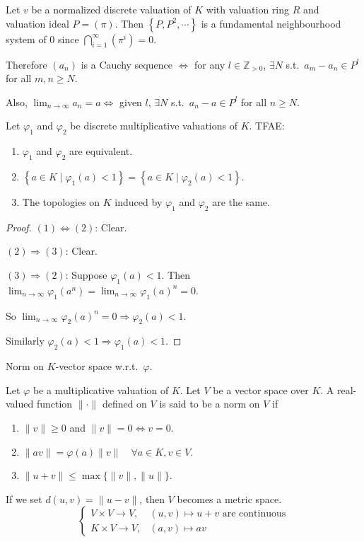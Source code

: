 \documentclass[11pt, a4paper]{report}
\begin{document}
\begin{proposition}
Let $v$ be a normalized discrete valuation of $K$ with valuation ring $R$ and valuation ideal $P=(\pi)$. Then $\left\{P, P^{2}, \cdots\right\}$ is a fundamental neighbourhood system of $0$ since $\bigcap_{i=1}^{\infty}\left(\pi^{i}\right)=0$.

Therefore $\left(a_{n}\right)$ is a Cauchy sequence $\Leftrightarrow$ for any $l \in \mathbb{Z}_{>0}$, $\exists N$ s.t.\ $a_{m}-a_{n} \in P^{l}$ for all $m, n \geqslant N$.

Also, $\lim _{n \rightarrow \infty} a_{n}=a \Leftrightarrow$ given $l$, $\exists N$ s.t.\ $a_{n}-a \in P^{l}$ for all $n \geqslant N$.
\end{proposition}

\begin{lemma}
Let $\varphi_{1}$ and $\varphi_{2}$ be discrete multiplicative valuations of $K$. TFAE:
\begin{enumerate}
\item $\varphi_{1}$ and $\varphi_{2}$ are equivalent.
\item $\left\{a \in K \mid \varphi_{1}(a)<1\right\}=\left\{a \in K \mid \varphi_{2}(a)<1\right\}$.
\item The topologies on $K$ induced by $\varphi_{1}$ and $\varphi_{2}$ are the same.
\end{enumerate}
\end{lemma}

\begin{proof}
$(1) \Leftrightarrow (2)$: Clear.

$(2) \Rightarrow (3)$: Clear.

$(3) \Rightarrow (2)$: Suppose $\varphi_{1}(a)<1$. Then $\lim _{n \rightarrow \infty} \varphi_{1}\left(a^{n}\right)=\lim _{n \rightarrow \infty} \varphi_{1}(a)^{n}=0$.

So $\lim _{n \rightarrow \infty} \varphi_{2}(a)^{n}=0 \Rightarrow \varphi_{2}(a)<1$.

Similarly $\varphi_{2}(a)<1 \Rightarrow \varphi_{1}(a)<1$.
\end{proof}
\begin{definition}
Norm on $K$-vector space w.r.t.\ $\varphi$.

Let $\varphi$ be a multiplicative valuation of $K$. Let $V$ be a vector space over $K$. A real-valued function $\|\cdot\|$ defined on $V$ is said to be a norm on $V$ if
\begin{enumerate}
\item $\|v\| \geqslant 0$ and $\|v\|=0 \Leftrightarrow v=0$.
\item $\|av\|=\varphi(a)\|v\| \quad \forall a \in K, v \in V$.
\item $\|u+v\| \leq \max \{\|v\|,\|u\|\}$.
\end{enumerate}
If we set $d(u, v)=\|u-v\|$, then $V$ becomes a metric space.
\[
\begin{cases}
V \times V \to V, & (u, v) \mapsto u+v \text{ are continuous} \\
K \times V \to V, & (a, v) \mapsto av
\end{cases}
\]
\end{definition}
\end{document}
